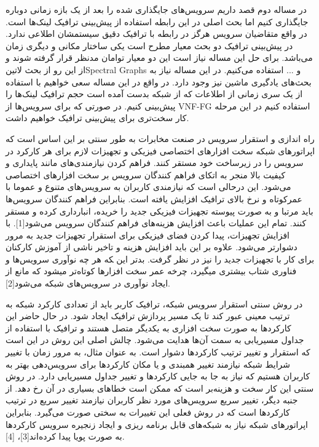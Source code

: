 \documentclass{article}
\begin{document}
در مساله دوم قصد داریم سرویس‌های جایگذاری شده را بعد از یک بازه زمانی دوباره جایگذاری کنیم اما بحث اصلی در این رابطه استفاده از پیش‌بینی ترافیک لینک‌ها است.
در واقع متقاضیان سرویس هرگز در رابطه با ترافیک دقیق سیستمشان اطلاعی ندارد. در پیش‌بینی ترافیک دو بحث معیار مطرح است یکی ساختار مکانی و دیگری زمان می‌باشد.
برای حل این مساله نیاز است این دو معیار توامان مدنظر قرار گرفته شوند و از این رو از بحث ‌لاتین{Spectral Graphs} و ... استفاده می‌کنیم.
در این مساله نیاز به بحث‌های یادگیری ماشین نیز وجود دارد. در واقع در این مساله سعی خواهیم با استفاده از یک سری زمانی از اطلاعات که از شبکه بدست آمده است حجم ترافیک لینک‌ها را پیش‌بینی کنیم.
در صورتی که برای سرویس‌ها از VNF-FG استفاده کنیم در این مرحله کار سخت‌تری برای پیش‌بینی ترافیک خواهیم داشت.


راه اندازی و استقرار سرویس در صنعت مخابرات به طور سنتی بر این اساس است که اپراتورهای شبکه سخت افزارهای اختصاصی فیزیکی
و تجهیزات لازم برای هر کارکرد در سرویس را در زیرساخت خود مستقر کنند.
فراهم کردن نیازمندی‌های مانند پایداری و کیفیت بالا منجر به اتکای فراهم کنندگان سرویس بر سخت افزارهای اختصاصی می‌شود.
این درحالی است که نیازمندی کاربران به سرویس‌های متنوع و عموما با عمرکوتاه و نرخ بالای ترافیک افزایش یافته است.
بنابراین فراهم کنندگان سرویس‌ها باید مرتبا و به صورت پیوسته تجهیزات فیزیکی جدید را خریده، انبارداری کرده و مستقر کنند.
تمام این عملیات باعث افزایش هزینه‌های فراهم کنندگان سرویس می‌شود[1].
با افزایش تجهیزات، پیدا کردن فضای فیزیکی برای استقرار تجهیزات جدید به مرور دشوارتر می‌شود.
علاوه بر این باید افزایش هزینه و تاخیر ناشی از آموزش کارکنان برای کار با تجهیزات جدید را نیز در نظر گرفت.
بدتر این ‍که هر چه نوآوری سرویس‌ها و فناوری شتاب بیشتری می‍گیرد، چرخه عمر سخت افزارها کوتاه‌تر می‍شود که مانع از ایجاد نوآوری در سرویس‌های شبکه می‌شود[2].

در روش سنتی استقرار سرویس شبکه، ترافیک کاربر باید از تعدادی کارکرد شبکه به ترتیب معینی عبور کند تا یک مسیر پردازش ترافیک ایجاد شود.
در حال حاضر این کارکردها به صورت سخت افزاری به یکدیگر متصل هستند و ترافیک با استفاده از جداول مسیریابی به سمت آن‌ها هدایت می‌شود.
چالش اصلی این روش در این است که استقرار و تغییر ترتیب کارکردها دشوار است.
به عنوان مثال، به مرور زمان با تغییر شرایط شبکه نیازمند تغییر همبندی و یا مکان کارکردها برای سرویس‌دهی بهتر به کاربران هستیم که نیاز به جا به جایی کارکردها
و تغییر جداول مسیریابی دارد. در روش سنتی این کار سخت و هزینه‌بر است که ممکن است خطاهای بسیاری در آن رخ دهد.
از جنبه دیگر، تغییر سریع سرویس‌های مورد نظر کاربران نیازمند تغییر سریع در ترتیب کارکردها است که در روش فعلی این تغییرات به سختی صورت می‌گیرد.
بنابراین اپراتورهای شبکه نیاز به شبکه‌های قابل برنامه ریزی و ایجاد زنجیره سرویس کارکردها به صورت پویا پیدا کرده‌اند[3]، [4].
\end{document}
